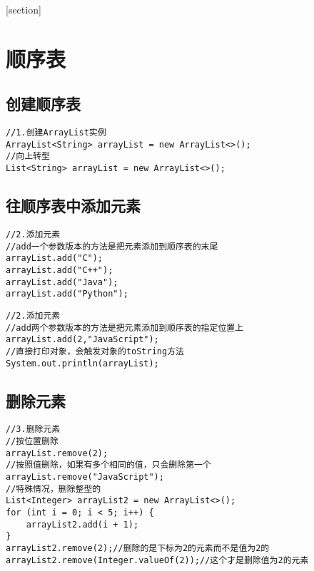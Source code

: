 \documentclass[a4paper]{report}
\begin{document}
\flushbottom%
\newcommand{\dm}[1]{\colorbox{wgray}{\lstinline`#1`}}
\newcommand{\myroman}[1]{\uppercase\expandafter{\romannumeral#1}}
[section] \renewcommand{\thenum}{\arabic{num}.} \newcommand{\num}{\refstepcounter{num}\text{\thenum}}

\newenvironment{tips}{\kaishu\zihao{-6}\color{blue}{\noindent\rule[-3pt]{\textwidth}{0.5pt}\par \em \noindent {\zihao{-5} \textcolor[rgb]{1.00,0.00,0.00}{Tips}}}\par}{\\ \rule[3mm]{\textwidth}{0.5pt}\par}

\newenvironment{zhengming}{\kaishu\zihao{-5}\color{blue}{\noindent\em 证明：}\par}{\hfill $\diamondsuit$\par}

\tableofcontents
{}%
\clearpage
{}%
\chapter{顺序表}
\section{创建顺序表}
\begin{lstlisting}
//1.创建ArrayList实例
ArrayList<String> arrayList = new ArrayList<>();
//向上转型
List<String> arrayList = new ArrayList<>();
\end{lstlisting}
\section{往顺序表中添加元素}
\begin{lstlisting}[title=add一个参数]
//2.添加元素
//add一个参数版本的方法是把元素添加到顺序表的末尾
arrayList.add("C");
arrayList.add("C++");
arrayList.add("Java");
arrayList.add("Python");
\end{lstlisting}

\begin{lstlisting}[title=add两个参数]
//2.添加元素
//add两个参数版本的方法是把元素添加到顺序表的指定位置上
arrayList.add(2,"JavaScript");
//直接打印对象，会触发对象的toString方法
System.out.println(arrayList);
\end{lstlisting}
\section{删除元素}
\begin{lstlisting}
//3.删除元素
//按位置删除
arrayList.remove(2);
//按照值删除，如果有多个相同的值，只会删除第一个
arrayList.remove("JavaScript");
//特殊情况，删除整型的
List<Integer> arrayList2 = new ArrayList<>();
for (int i = 0; i < 5; i++) {
    arrayList2.add(i + 1);
}
arrayList2.remove(2);//删除的是下标为2的元素而不是值为2的
arrayList2.remove(Integer.valueOf(2));//这个才是删除值为2的元素
\end{lstlisting}
\end{document}

